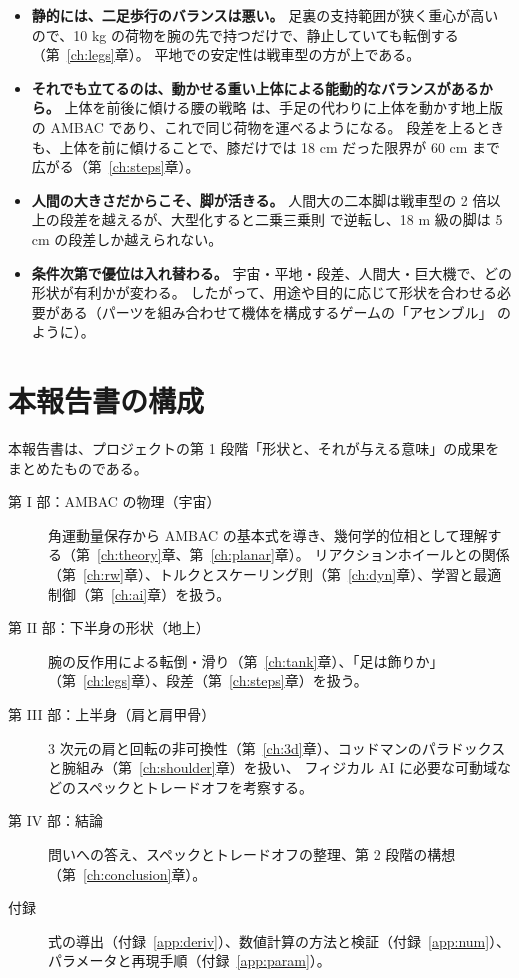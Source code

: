 \begin{itemize}
\item \textbf{静的には、二足歩行のバランスは悪い。}
  足裏の支持範囲が狭く重心が高いので、10 kg の荷物を腕の先で持つだけで、静止していても転倒する（第~\ref{ch:legs}章）。
  平地での安定性は戦車型の方が上である。
\item \textbf{それでも立てるのは、動かせる重い上体による能動的なバランスがあるから。}
  上体を前後に傾ける腰の戦略 \cite{R31} は、手足の代わりに上体を動かす地上版の AMBAC であり、これで同じ荷物を運べるようになる。
  段差を上るときも、上体を前に傾けることで、膝だけでは 18 cm だった限界が 60 cm まで広がる（第~\ref{ch:steps}章）。
\item \textbf{人間の大きさだからこそ、脚が活きる。}
  人間大の二本脚は戦車型の 2 倍以上の段差を越えるが、大型化すると二乗三乗則 \cite{R33} で逆転し、18 m 級の脚は 5 cm の段差しか越えられない。
\item \textbf{条件次第で優位は入れ替わる。}
  宇宙・平地・段差、人間大・巨大機で、どの形状が有利かが変わる。
  したがって、用途や目的に応じて形状を合わせる必要がある（パーツを組み合わせて機体を構成するゲームの「アセンブル」\cite{R3} のように）。
\end{itemize}

\section{本報告書の構成}

本報告書は、プロジェクトの第 1 段階「形状と、それが与える意味」の成果をまとめたものである。

\begin{description}
\item[第 I 部：AMBAC の物理（宇宙）] 角運動量保存から AMBAC の基本式を導き、幾何学的位相として理解する（第~\ref{ch:theory}章、第~\ref{ch:planar}章）。
  リアクションホイールとの関係（第~\ref{ch:rw}章）、トルクとスケーリング則（第~\ref{ch:dyn}章）、学習と最適制御（第~\ref{ch:ai}章）を扱う。
\item[第 II 部：下半身の形状（地上）] 腕の反作用による転倒・滑り（第~\ref{ch:tank}章）、「足は飾りか」（第~\ref{ch:legs}章）、段差（第~\ref{ch:steps}章）を扱う。
\item[第 III 部：上半身（肩と肩甲骨）] 3 次元の肩と回転の非可換性（第~\ref{ch:3d}章）、コッドマンのパラドックスと腕組み（第~\ref{ch:shoulder}章）を扱い、
  フィジカル AI に必要な可動域などのスペックとトレードオフを考察する。
\item[第 IV 部：結論] 問いへの答え、スペックとトレードオフの整理、第 2 段階の構想（第~\ref{ch:conclusion}章）。
\item[付録] 式の導出（付録~\ref{app:deriv}）、数値計算の方法と検証（付録~\ref{app:num}）、パラメータと再現手順（付録~\ref{app:param}）。
\end{description}

